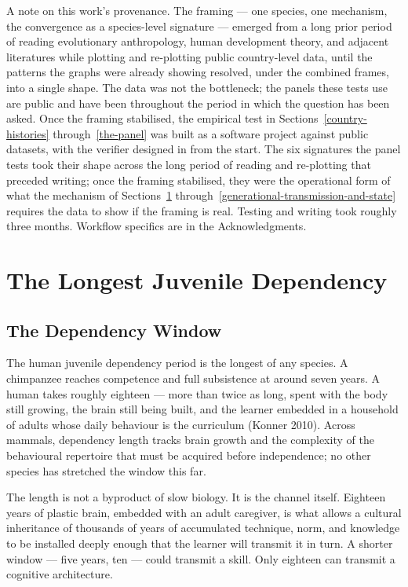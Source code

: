 \documentclass[12pt,letterpaper]{article}
\begin{document}
A note on this work's provenance. The framing --- one species, one
mechanism, the convergence as a species-level signature --- emerged
from a long prior period of reading evolutionary anthropology, human
development theory, and adjacent literatures while plotting and
re-plotting public country-level data, until the patterns the graphs
were already showing resolved, under the combined frames, into a
single shape. The data was not the bottleneck; the panels these
tests use are public and have been throughout the period in which
the question has been asked. Once the framing
stabilised, the empirical test in Sections~\ref{country-histories}
through~\ref{the-panel} was built as a software project against
public datasets, with the verifier designed in from the start. The six signatures the panel tests took their shape across the
long period of reading and re-plotting that preceded writing;
once the framing stabilised, they were the operational form of
what the mechanism of Sections~\ref{longest-juvenile-dependency}
through~\ref{generational-transmission-and-state} requires the
data to show if the framing is real. Testing and writing
took roughly three months. Workflow specifics are in the Acknowledgments.


\section{The Longest Juvenile Dependency}\label{longest-juvenile-dependency}

\subsection{The Dependency Window}\label{the-dependency-window}

The human juvenile dependency period is the longest of any species.
A chimpanzee reaches competence and full subsistence at around seven
years. A human takes roughly eighteen --- more than twice as long,
spent with the body still growing, the brain still being built, and
the learner embedded in a household of adults whose daily behaviour
is the curriculum (Konner 2010). Across mammals, dependency length
tracks brain growth and the complexity of the behavioural repertoire
that must be acquired before independence; no other species has
stretched the window this far.

The length is not a byproduct of slow biology. It is the channel
itself. Eighteen years of plastic brain, embedded with an adult
caregiver, is what allows a cultural inheritance of thousands of
years of accumulated technique, norm, and knowledge to be installed
deeply enough that the learner will transmit it in turn. A shorter
window --- five years, ten --- could transmit a skill. Only eighteen
can transmit a cognitive architecture.
\end{document}
